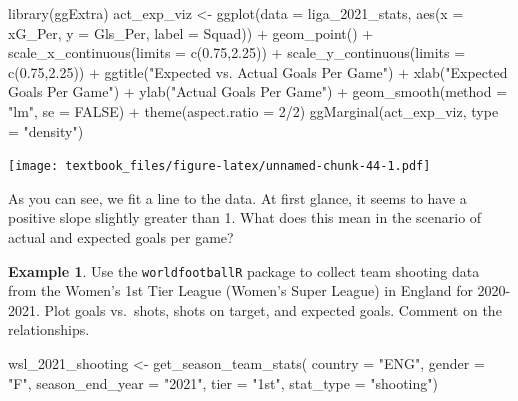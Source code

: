 \documentclass[
  11pt,
]{book}
\newenvironment{Shaded}{\begin{snugshade}}{\end{snugshade}}
\newcommand{\AttributeTok}[1]{\textcolor[rgb]{0.77,0.63,0.00}{#1}}
\newcommand{\ConstantTok}[1]{\textcolor[rgb]{0.00,0.00,0.00}{#1}}
\newcommand{\DecValTok}[1]{\textcolor[rgb]{0.00,0.00,0.81}{#1}}
\newcommand{\FloatTok}[1]{\textcolor[rgb]{0.00,0.00,0.81}{#1}}
\newcommand{\FunctionTok}[1]{\textcolor[rgb]{0.00,0.00,0.00}{#1}}
\newcommand{\NormalTok}[1]{#1}
\newcommand{\OtherTok}[1]{\textcolor[rgb]{0.56,0.35,0.01}{#1}}
\newcommand{\SpecialCharTok}[1]{\textcolor[rgb]{0.00,0.00,0.00}{#1}}
\newcommand{\StringTok}[1]{\textcolor[rgb]{0.31,0.60,0.02}{#1}}
\theoremstyle{definition}
\theoremstyle{definition}
\newtheorem{example}{Example}[chapter]
\theoremstyle{definition}
\theoremstyle{definition}
\theoremstyle{remark}
\begin{document}
\begin{Shaded}
\begin{Highlighting}[]
\FunctionTok{library}\NormalTok{(ggExtra)}
\NormalTok{act\_exp\_viz }\OtherTok{\textless{}{-}} \FunctionTok{ggplot}\NormalTok{(}\AttributeTok{data =}\NormalTok{ liga\_2021\_stats, }
                      \FunctionTok{aes}\NormalTok{(}\AttributeTok{x =}\NormalTok{ xG\_Per, }\AttributeTok{y =}\NormalTok{ Gls\_Per, }\AttributeTok{label =}\NormalTok{ Squad)) }\SpecialCharTok{+}
  \FunctionTok{geom\_point}\NormalTok{() }\SpecialCharTok{+}
  \FunctionTok{scale\_x\_continuous}\NormalTok{(}\AttributeTok{limits =} \FunctionTok{c}\NormalTok{(}\FloatTok{0.75}\NormalTok{,}\FloatTok{2.25}\NormalTok{)) }\SpecialCharTok{+}
  \FunctionTok{scale\_y\_continuous}\NormalTok{(}\AttributeTok{limits =} \FunctionTok{c}\NormalTok{(}\FloatTok{0.75}\NormalTok{,}\FloatTok{2.25}\NormalTok{)) }\SpecialCharTok{+}
  \FunctionTok{ggtitle}\NormalTok{(}\StringTok{"Expected vs. Actual Goals Per Game"}\NormalTok{) }\SpecialCharTok{+}
  \FunctionTok{xlab}\NormalTok{(}\StringTok{"Expected Goals Per Game"}\NormalTok{) }\SpecialCharTok{+}
  \FunctionTok{ylab}\NormalTok{(}\StringTok{"Actual Goals Per Game"}\NormalTok{) }\SpecialCharTok{+}
  \FunctionTok{geom\_smooth}\NormalTok{(}\AttributeTok{method =} \StringTok{"lm"}\NormalTok{, }\AttributeTok{se =} \ConstantTok{FALSE}\NormalTok{) }\SpecialCharTok{+}
  \FunctionTok{theme}\NormalTok{(}\AttributeTok{aspect.ratio =} \DecValTok{2}\SpecialCharTok{/}\DecValTok{2}\NormalTok{)}
\FunctionTok{ggMarginal}\NormalTok{(act\_exp\_viz, }\AttributeTok{type =} \StringTok{"density"}\NormalTok{)}
\end{Highlighting}
\end{Shaded}

\texttt{[image: textbook\_files/figure-latex/unnamed-chunk-44-1.pdf]}

As you can see, we fit a line to the data. At first glance, it seems to have a positive slope slightly greater than 1. What does this mean in the scenario of actual and expected goals per game?

\newpage

\begin{example}
Use the \texttt{worldfootballR} package to collect team shooting data from the Women's 1st Tier League (Women's Super League) in England for 2020-2021. Plot goals vs.~shots, shots on target, and expected goals. Comment on the relationships.
\end{example}

\begin{Shaded}
\begin{Highlighting}[]
\NormalTok{wsl\_2021\_shooting }\OtherTok{\textless{}{-}} \FunctionTok{get\_season\_team\_stats}\NormalTok{(}
  \AttributeTok{country =} \StringTok{"ENG"}\NormalTok{, }\AttributeTok{gender =} \StringTok{"F"}\NormalTok{, }\AttributeTok{season\_end\_year =} \StringTok{"2021"}\NormalTok{, }
  \AttributeTok{tier =} \StringTok{"1st"}\NormalTok{, }\AttributeTok{stat\_type =} \StringTok{"shooting"}\NormalTok{)}
\end{Highlighting}
\end{Shaded}
\end{document}

